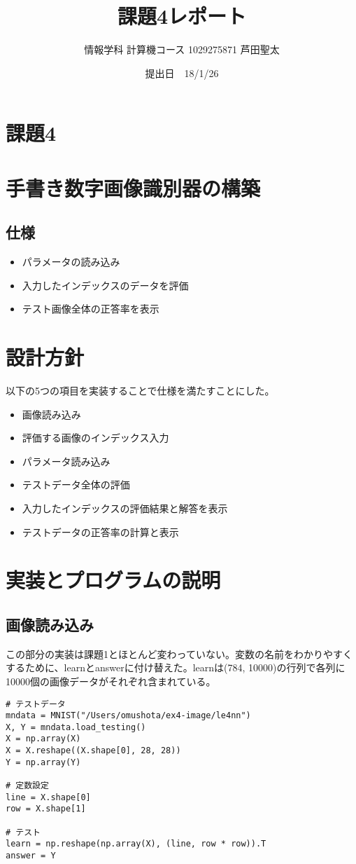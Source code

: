 \documentclass{ujarticle}
\title {課題4レポート}
\author{情報学科 計算機コース 1029275871 芦田聖太}
\date{提出日　18/1/26}
\begin{document}
\begin{titlepage}
\maketitle
\thispagestyle{empty}
\end{titlepage}



\section*{課題4}
\section*{手書き数字画像識別器の構築}
\subsection*{仕様}
\begin{itemize}
\item パラメータの読み込み
\item 入力したインデックスのデータを評価
\item テスト画像全体の正答率を表示
\end{itemize}


\section{設計方針}
以下の5つの項目を実装することで仕様を満たすことにした。
\begin{itemize}
\item 画像読み込み
\item 評価する画像のインデックス入力
\item パラメータ読み込み
\item テストデータ全体の評価
\item 入力したインデックスの評価結果と解答を表示
\item テストデータの正答率の計算と表示
\end{itemize}

\section{実装とプログラムの説明}
\subsection{画像読み込み}
この部分の実装は課題1とほとんど変わっていない。変数の名前をわかりやすくするために、learnとanswerに付け替えた。learnは(784, 10000)の行列で各列に10000個の画像データがそれぞれ含まれている。
\begin{lstlisting}[basicstyle=\ttfamily\footnotesize, frame=single]
# テストデータ
mndata = MNIST("/Users/omushota/ex4-image/le4nn")
X, Y = mndata.load_testing()
X = np.array(X)
X = X.reshape((X.shape[0], 28, 28))
Y = np.array(Y)

# 定数設定
line = X.shape[0]
row = X.shape[1]

# テスト
learn = np.reshape(np.array(X), (line, row * row)).T
answer = Y
\end{lstlisting}
\end{document}
